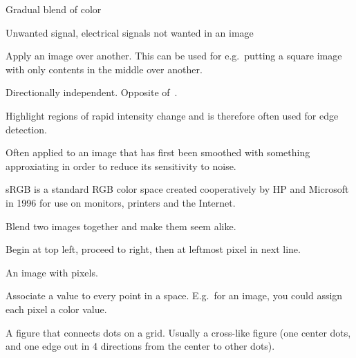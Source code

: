 \begin{definition}
    Gradual blend of color
\end{definition}

\begin{definition}
    Unwanted signal, electrical signals not wanted in an image
\end{definition}

\begin{definition}
    Apply an image over another. This can be used for e.g.\ putting a square image
    with only contents in the middle over another.
\end{definition}

\begin{definition}[Isotropy]\label{isotropy}
    Directionally independent. Opposite of~.
\end{definition}

\begin{definition}[Laplacian]
    Highlight regions of rapid intensity change and is therefore often used for
    edge detection.

    Often applied to an image that has first been smoothed with something
    approxiating in order to reduce its sensitivity to noise.

\end{definition}


\begin{definition}[SRGB]
    sRGB is a standard RGB color space created cooperatively by HP and
    Microsoft in 1996 for use on monitors, printers and the Internet.

\end{definition}


\begin{definition}
    Blend two images together and make them seem alike.
\end{definition}

\begin{definition}
    Begin at top left, proceed to right, then at leftmost pixel in next line.
\end{definition}

\begin{definition}
    An image with pixels.
\end{definition}

\begin{definition}\label{scalarfield}
    Associate a value to every point in a space. E.g.\ for an image, you
    could assign each pixel a color value.
\end{definition}

\begin{definition}[Stencil]
    A figure that connects dots on a grid. Usually a cross-like figure 
    (one center dots, and one edge out in 4 directions from the center to
    other dots).
\end{definition}
